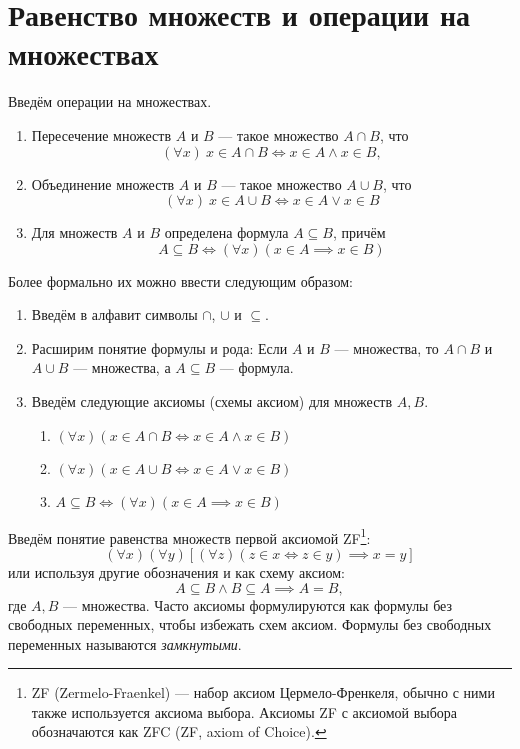 \section{Равенство множеств и операции на множествах}

Введём операции на множествах.
\begin{enumerate}
	\item{}Пересечение множеств $A$ и $B$ --- такое множество $A\cap B$, что
	\[
		(\forall x)~x\in A\cap B\iff x\in A\land x\in B,
	\]

	\item{}Объединение множеств $A$ и $B$ --- такое множество $A\cup B$, что
	\[
		(\forall x)~x\in A\cup B\iff x\in A\lor x\in B
	\]

	\item{}Для множеств $A$ и $B$ определена формула $A\subseteq B$, причём
	\[
		A\subseteq B\iff (\forall x)(x\in A\implies x\in B)
	\]
\end{enumerate}

Более формально их можно ввести следующим образом:
\begin{enumerate}
	\item{}Введём в алфавит символы $\cap$, $\cup$ и $\subseteq$.
	\item{}Расширим понятие формулы и рода: Если $A$ и $B$ --- множества,
	то  $A\cap B$ и $A\cup B$ --- множества, а $A\subseteq B$ --- формула.
	\item{}Введём следующие аксиомы (схемы аксиом) для множеств $A,B$.
	\begin{enumerate}
		\item{}$(\forall x)(x\in A\cap B\iff x\in A\land x\in B)$
		\item{}$(\forall x)(x\in A\cup B\iff x\in A\lor x\in B)$
		\item{}$A\subseteq B \iff (\forall x)(x\in A\implies x\in B)$
	\end{enumerate}
\end{enumerate}

Введём понятие равенства множеств первой аксиомой ZF\footnote{
	ZF (Zermelo-Fraenkel) --- набор аксиом Цермело-Френкеля, обычно с ними также
	используется аксиома выбора. Аксиомы ZF с аксиомой выбора
	обозначаются как ZFC (ZF, axiom of Choice).
}:
\[
	(\forall x)(\forall y)[(\forall z)(z\in x\iff z\in y)\implies x=y]
\]
или используя другие обозначения и как схему аксиом:
\[
	A\subseteq B\land B\subseteq A\implies A=B,
\]
где $A,B$ --- множества. Часто аксиомы формулируются как формулы без
свободных переменных, чтобы избежать схем аксиом.
Формулы без свободных переменных называются {\it замкнутыми}.

